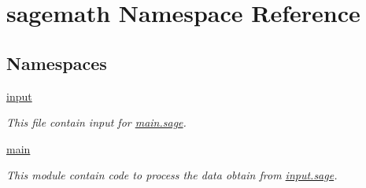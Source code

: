 \hypertarget{namespacesagemath}{}\section{sagemath Namespace Reference}
\label{namespacesagemath}
\subsection*{Namespaces}
\begin{DoxyCompactItemize}
\item 
 \hyperlink{namespacesagemath_1_1input}{input}
\begin{DoxyCompactList}\small\item\em This file contain input for \hyperlink{main_8sage}{main.\+sage}. \end{DoxyCompactList}\item 
 \hyperlink{namespacesagemath_1_1main}{main}
\begin{DoxyCompactList}\small\item\em This module contain code to process the data obtain from \hyperlink{input_8sage}{input.\+sage}. \end{DoxyCompactList}\end{DoxyCompactItemize}

